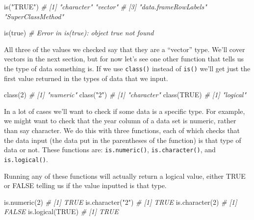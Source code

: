 \documentclass[
]{krantz}
\makeatletter
\newenvironment{Shaded}{\begin{snugshade}}{\end{snugshade}}
\newcommand{\CommentTok}[1]{\textcolor[rgb]{0.37,0.37,0.37}{\textit{#1}}}
\newcommand{\ConstantTok}[1]{\textcolor[rgb]{0,0,0}{#1}}
\newcommand{\DecValTok}[1]{\textcolor[rgb]{0.06,0.06,0.06}{#1}}
\newcommand{\FunctionTok}[1]{\textcolor[rgb]{0,0,0}{#1}}
\newcommand{\NormalTok}[1]{#1}
\newcommand{\StringTok}[1]{\textcolor[rgb]{0.5,0.5,0.5}{#1}}
\newenvironment{kframe}{%
\medskip{}
\setlength{\fboxsep}{.8em}
 \def\at@end@of@kframe{}%
 \ifinner\ifhmode%
  \def\at@end@of@kframe{\end{minipage}}%
  \begin{minipage}{\columnwidth}%
 \fi\fi%
 \def\FrameCommand##1{\hskip\@totalleftmargin \hskip-\fboxsep
 \colorbox{shadecolor}{##1}\hskip-\fboxsep
     \hskip-\linewidth \hskip-\@totalleftmargin \hskip\columnwidth}%
 \MakeFramed {\advance\hsize-\width
   \@totalleftmargin\z@ \linewidth\hsize
   \@setminipage}}%
 {\par\unskip\endMakeFramed%
 \at@end@of@kframe}
\renewenvironment{Shaded}{\begin{kframe}}{\end{kframe}}
\makeatother
\begin{document}
\begin{Shaded}
\begin{Highlighting}[]
\FunctionTok{is}\NormalTok{(}\StringTok{"TRUE"}\NormalTok{)}
\CommentTok{\# [1] "character"           "vector"             }
\CommentTok{\# [3] "data.frameRowLabels" "SuperClassMethod"}
\end{Highlighting}
\end{Shaded}

\begin{Shaded}
\begin{Highlighting}[]
\FunctionTok{is}\NormalTok{(true)}
\CommentTok{\# Error in is(true): object \textquotesingle{}true\textquotesingle{} not found}
\end{Highlighting}
\end{Shaded}

All three of the values we checked say that they are a
``vector'' type. We'll cover vectors in the next section,
but for now let's see one other function that tells us the
type of data something is. If we use \texttt{class()}
instead of \texttt{is()} we'll get just the first value
returned in the types of data that we input.

\begin{Shaded}
\begin{Highlighting}[]
\FunctionTok{class}\NormalTok{(}\DecValTok{2}\NormalTok{)}
\CommentTok{\# [1] "numeric"}
\FunctionTok{class}\NormalTok{(}\StringTok{"2"}\NormalTok{)}
\CommentTok{\# [1] "character"}
\FunctionTok{class}\NormalTok{(}\ConstantTok{TRUE}\NormalTok{)}
\CommentTok{\# [1] "logical"}
\end{Highlighting}
\end{Shaded}

In a lot of cases we'll want to check if some data is a
specific type. For example, we might want to check that the
year column of a data set is numeric, rather than say
character. We do this with three functions, each of which
checks that the data input (the data put in the parentheses
of the function) is that type of data or not. These
functions are: \texttt{is.numeric()},
\texttt{is.character()}, and \texttt{is.logical()}.

Running any of these functions will actually return a
logical value, either TRUE or FALSE telling us if the value
inputted is that type.

\begin{Shaded}
\begin{Highlighting}[]
\FunctionTok{is.numeric}\NormalTok{(}\DecValTok{2}\NormalTok{)}
\CommentTok{\# [1] TRUE}
\FunctionTok{is.character}\NormalTok{(}\StringTok{"2"}\NormalTok{)}
\CommentTok{\# [1] TRUE}
\FunctionTok{is.character}\NormalTok{(}\DecValTok{2}\NormalTok{)}
\CommentTok{\# [1] FALSE}
\FunctionTok{is.logical}\NormalTok{(}\ConstantTok{TRUE}\NormalTok{)}
\CommentTok{\# [1] TRUE}
\end{Highlighting}
\end{Shaded}
\end{document}
